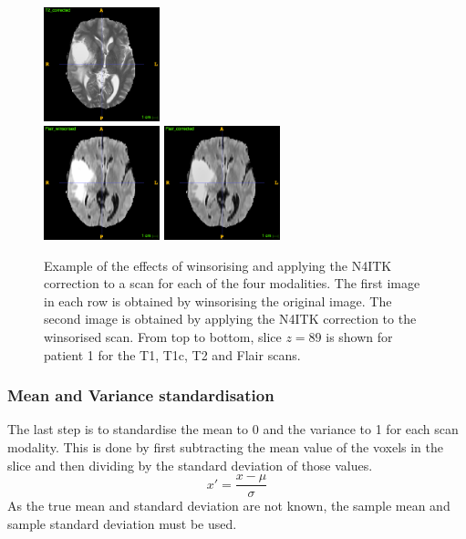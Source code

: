 \documentclass[12pt,a4paper,twoside,openright]{report}
\begin{document}
\begin{figure}
	\includegraphics[width=0.3\textwidth]{t2_n4itk_example} \\
	\vspace{0.5cm}
	\includegraphics[width=0.3\textwidth]{flair_winsorized_example}
	\includegraphics[width=0.3\textwidth]{flair_n4itk_example}
	\caption[Example of the effects of winsorising and applying the N4ITK correction to a scan for each of the four modalities.]{Example of the effects of winsorising and applying the N4ITK correction to a scan for each of the four modalities. The first image in each row is obtained by winsorising the original image. The second image is obtained by applying the N4ITK correction to the winsorised scan. From top to bottom, slice $z=89$ is shown for patient 1 for the T1, T1c, T2 and Flair scans.}
	\label{fig:n4itk_example}
\end{figure}

\subsubsection{Mean and Variance standardisation}
The last step is to standardise the mean to 0 and the variance to 1 for each scan modality. This is done by first subtracting the mean value of the voxels in the slice and then dividing by the standard deviation of those values. 
\begin{equation}
	x' = \frac{x - \mu}{\sigma}
\end{equation}
As the true mean and standard deviation are not known, the sample mean and sample standard deviation must be used. 
\end{document}

